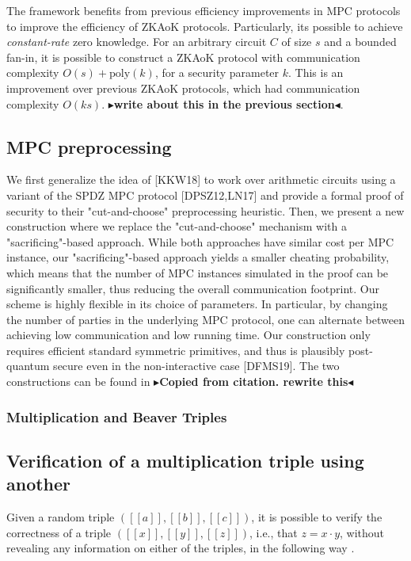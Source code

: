 \documentclass[twoside,11pt,openright]{report}
\theoremstyle{definition}
\theoremstyle{plain}
\newcommand{\todo}[1]{{\color[rgb]{.5,0,0}\textbf{$\blacktriangleright$#1$\blacktriangleleft$}}}
\begin{document}
The framework benefits from previous efficiency improvements in MPC protocols to improve the efficiency of ZKAoK protocols. Particularly, its possible to achieve \textit{constant-rate} zero knowledge. For an arbitrary circuit $C$ of size $s$ and a bounded fan-in, it is possible to construct a ZKAoK protocol with communication complexity $O(s) + \text{poly}(k)$, for a security parameter $k$. This is an improvement over previous ZKAoK protocols, which had communication complexity $O(ks)$. \todo{write about this in the previous section}.

\subsection{MPC preprocessing}

We first generalize the idea of [KKW18] to work over arithmetic circuits using a variant of the SPDZ MPC protocol [DPSZ12,LN17] and provide a formal proof of security to their "cut-and-choose" preprocessing heuristic. Then, we present a new construction where we replace the "cut-and-choose" mechanism with a "sacrificing"-based approach. While both approaches have similar cost per MPC instance, our "sacrificing"-based approach yields a smaller cheating probability, which means that the number of MPC instances simulated in the proof can be significantly smaller, thus reducing the overall communication footprint. Our scheme is highly flexible in its choice of parameters. In particular, by changing the number of parties in the underlying MPC protocol, one can alternate between achieving low communication and low running time. Our construction only requires efficient standard symmetric primitives, and thus is plausibly post-quantum secure even in the non-interactive case [DFMS19]. The two constructions can be found in \cite{baum2020concretely} \todo{Copied from citation. rewrite this}

\subsubsection{Multiplication and Beaver Triples}
\label{sec:beaver}

\subsection{Verification of a multiplication triple using another}
\label{sec:verify}
Given a random triple $([[a]], [[b]], [[c]])$, it is possible to verify the correctness of a triple $([[x]], [[y]], [[z]])$, i.e., that $z = x \cdot y$, without revealing any information on either of the triples, in the following way \cite{baum2020concretely}.
\end{document}
